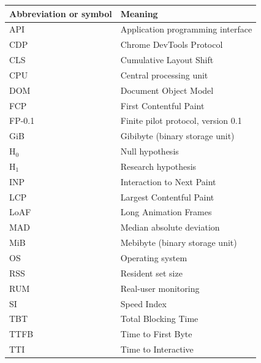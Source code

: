 
\begin{longtable}{@{}p{}p{}@{}}
\textbf{Abbreviation or symbol} & \textbf{Meaning} \\
\endhead
API & Application programming interface \\
CDP & Chrome DevTools Protocol \\
CLS & Cumulative Layout Shift \\
CPU & Central processing unit \\
DOM & Document Object Model \\
FCP & First Contentful Paint \\
FP-0.1 & Finite pilot protocol, version 0.1 \\
GiB & Gibibyte (binary storage unit) \\
H$_0$ & Null hypothesis \\
H$_1$ & Research hypothesis \\
INP & Interaction to Next Paint \\
LCP & Largest Contentful Paint \\
LoAF & Long Animation Frames \\
MAD & Median absolute deviation \\
MiB & Mebibyte (binary storage unit) \\
OS & Operating system \\
RSS & Resident set size \\
RUM & Real-user monitoring \\
SI & Speed Index \\
TBT & Total Blocking Time \\
TTFB & Time to First Byte \\
TTI & Time to Interactive \\
\end{longtable}
